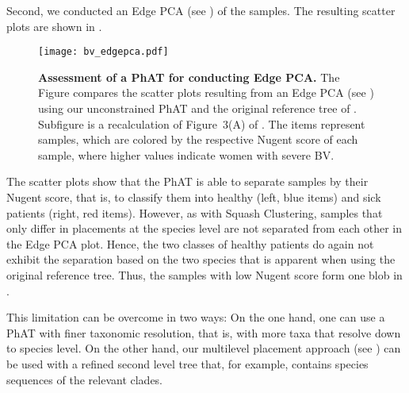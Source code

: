 Second, we conducted an Edge PCA \cite{Matsen2011a}
(see )
of the samples.
The resulting scatter plots are shown in .

\begin{figure}[hpbt]
    \centering
    \texttt{[image: bv\_edgepca.pdf]}
    \begin{subfigure}{0pt}
        \label{fig:bv_edgepca:sub:edgepca_art}
    \end{subfigure}
    \begin{subfigure}{0pt}
        \label{fig:bv_edgepca:sub:edgepca_orig}
    \end{subfigure}
    \caption[Assessment of a \acs{PhAT} for conducting Edge PCA]{
        \textbf{Assessment of a \acs{PhAT} for conducting Edge PCA.}
        The Figure compares the scatter plots resulting from an Edge PCA
        (see )
        using  our unconstrained  \acs{PhAT} and
         the original reference tree of .
        Subfigure  is a recalculation of Figure~3(A) of .
        The items represent samples, which are colored by the respective Nugent score of each sample,
        where higher values indicate women with severe \acl{BV}.
    }
    \label{fig:bv_edgepca}
\end{figure}

The scatter plots show that the \ac{PhAT} is able to separate samples by their Nugent score, that is, to classify them
into healthy (left, blue items) and sick patients (right, red items).
However, as with Squash Clustering, samples that only differ in placements at the species level
are not separated from each other in the Edge PCA plot.
Hence, the two classes of healthy patients do again not exhibit
the separation based on the two  species that is apparent when using the original reference tree.
Thus, the samples with low Nugent score form one blob in .

This limitation can be overcome in two ways:
On the one hand, one can use a \ac{PhAT} with finer taxonomic resolution,
that is, with more taxa that resolve down to species level.
On the other hand, our multilevel placement approach (see )
can be used with a refined second level tree that, 
for example, contains species sequences of the relevant  clades.

